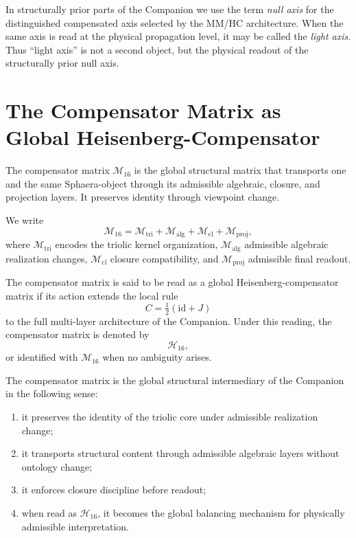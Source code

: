 \begin{remark}
In structurally prior parts of the Companion we use the term \emph{null axis}
for the distinguished compensated axis selected by the MM/HC architecture.
When the same axis is read at the physical propagation level, it may be called
the \emph{light axis}. Thus ``light axis'' is not a second object, but the
physical readout of the structurally prior null axis.
\end{remark}

\section{The Compensator Matrix as Global Heisenberg-Compensator}
\label{sec:millennium-hc}

\begin{definition}
The compensator matrix $\mathcal M_{16}$ is the global structural matrix that
transports one and the same Sphaera-object through its admissible algebraic,
closure, and projection layers. It preserves identity through viewpoint
change.
\end{definition}

\begin{definition}
We write
\[
\mathcal M_{16}
=
\mathcal M_{\mathrm{tri}}
+
\mathcal M_{\mathrm{alg}}
+
\mathcal M_{\mathrm{cl}}
+
\mathcal M_{\mathrm{proj}},
\]
where $\mathcal M_{\mathrm{tri}}$ encodes the triolic kernel organization,
$\mathcal M_{\mathrm{alg}}$ admissible algebraic realization changes,
$\mathcal M_{\mathrm{cl}}$ closure compatibility, and
$\mathcal M_{\mathrm{proj}}$ admissible final readout.
\end{definition}

\begin{definition}
The compensator matrix is said to be read as a global Heisenberg-compensator
matrix if its action extends the local rule
\[
C=\tfrac12(\mathrm{id}+J)
\]
to the full multi-layer architecture of the Companion. Under this reading, the
compensator matrix is denoted by
\[
\mathcal H_{16},
\]
or identified with $\mathcal M_{16}$ when no ambiguity arises.
\end{definition}

\begin{theorem}
\label{thm:mm-role}
The compensator matrix is the global structural intermediary of the Companion in
the following sense:
\begin{enumerate}
 \item it preserves the identity of the triolic core under admissible
 realization change;
 \item it transports structural content through admissible algebraic layers
 without ontology change;
 \item it enforces closure discipline before readout;
 \item when read as $\mathcal H_{16}$, it becomes the global balancing
 mechanism for physically admissible interpretation.
\end{enumerate}
\end{theorem}

